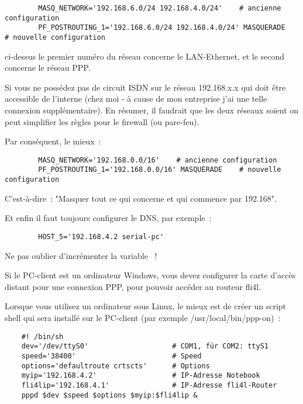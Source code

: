 \begin{description}
\begin{example}
\begin{verbatim}
        MASQ_NETWORK='192.168.6.0/24 192.168.4.0/24'    # ancienne configuration
        PF_POSTROUTING_1='192.168.6.0/24 192.168.4.0/24' MASQUERADE    # nouvelle configuration
\end{verbatim}
\end{example}

           ci-dessus le premier numéro du réseau concerne le LAN-Ethernet,
           et le second concerne le réseau PPP.

           Si vous ne possédez pas de circuit ISDN sur le réseau 192.168.x.x
           qui doit être accessible de l'interne (chez moi - à cause de mon entreprise
           j'ai une telle connexion supplémentaire). En résumer, il faudrait que
           les deux réseaux soient  on peut
           simplifier les règles pour le firewall (ou pare-feu).

           Par conséquent, le mieux~:

\begin{example}
\begin{verbatim}
        MASQ_NETWORK='192.168.0.0/16'    # ancienne configuration
        PF_POSTROUTING_1='192.168.0.0/16' MASQUERADE    # nouvelle configuration
\end{verbatim}
\end{example}

           C'est-à-dire~: "Masquer tout ce qui concerne et qui commence par 192.168".


           Et enfin il faut toujours configurer le DNS, par exemple~:

\begin{example}
\begin{verbatim}
        HOST_5='192.168.4.2 serial-pc'
\end{verbatim}
\end{example}

           Ne pas oublier d'incrémenter la variable ~!

           Si le PC-client est un ordinateur Windows, vous devez configurer la carte
           d'accès distant pour une connexion PPP, pour pouvoir accéder au routeur fli4l.

           Lorsque vous utilisez un ordinateur sous Linux, le mieux est de créer un script
           shell qui sera installé sur le PC-client (par exemple /usr/local/bin/ppp-on)~:
\begin{example}
\begin{verbatim}
    #! /bin/sh
    dev='/dev/ttyS0'                    # COM1, für COM2: ttyS1
    speed='38400'                       # Speed
    options='defaultroute crtscts'      # Options
    myip='192.168.4.2'                  # IP-Adresse Notebook
    fli4lip='192.168.4.1'               # IP-Adresse fli4l-Router
    pppd $dev $speed $options $myip:$fli4lip &
\end{verbatim}
\end{example}


\end{description}
